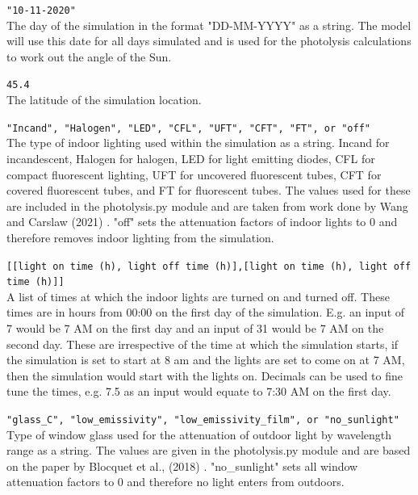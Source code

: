 \documentclass[a4paper]{refart}
\begin{document}
\texttt{"10-11-2020"}\\
The day of the simulation in the format "DD-MM-YYYY" as a string. The model will use this date for all days simulated and is used for the photolysis calculations to work out the angle of the Sun.

\texttt{45.4}\\
The latitude of the simulation location.

\texttt{"Incand", "Halogen", "LED", "CFL", "UFT", "CFT", "FT", or "off"}\\
The type of indoor lighting used within the simulation as a string. Incand for incandescent, Halogen for halogen, LED for light emitting diodes, CFL for compact fluorescent lighting, UFT for uncovered fluorescent tubes, CFT for covered fluorescent tubes, and FT for fluorescent tubes. The values used for these are included in the photolysis.py  module and are taken from work done by Wang and Carslaw (2021) \cite{Wang2021}. "off" sets the attenuation factors of indoor lights to 0 and therefore removes indoor lighting from the simulation.

\texttt{[[light on time (h), light off time (h)],[light on time (h), light off time (h)]]}\\
A list of times at which the indoor lights are turned on and turned off. These times are in hours from 00:00 on the first day of the simulation. E.g. an input of 7 would be 7 AM on the first day and an input of 31 would be 7 AM on the second day. These are irrespective of the time at which the simulation starts, if the simulation is set to start at 8 am and the lights are set to come on at 7 AM, then the simulation would start with the lights on. Decimals can be used to fine tune the times, e.g. 7.5 as an input would equate to 7:30 AM on the first day.

\texttt{"glass\_C", "low\_emissivity", "low\_emissivity\_film", or "no\_sunlight"}\\
Type of window glass used for the attenuation of outdoor light by wavelength range as a string. The values are given in the photolysis.py module  and are based on the paper by Blocquet et al., (2018) \cite{Blocquet2018}. "no\_sunlight" sets all window attenuation factors to 0 and therefore no light enters from outdoors.
\end{document}
